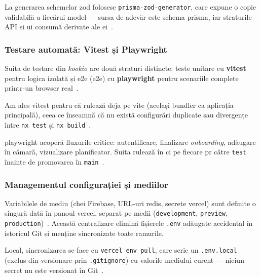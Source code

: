 La generarea schemelor \gls{zod} folosesc \texttt{prisma-zod-generator}, care expune o copie validabilă a fiecărui model --- sursa de adevăr este schema \gls{prisma}, iar straturile API și \acrshort{ui} consumă derivate ale ei~\cite{prisma_zod_generator}.

\subsubsection{Testare automată: Vitest și Playwright}\label{subsec:testare}

Suita de testare din \textit{\gls{kookio}} are două straturi distincte: teste unitare cu \textbf{\gls{vitest}} pentru logica izolată și \acrlong{e2e} (\acrshort{e2e}) cu \textbf{\gls{playwright}} pentru scenariile complete printr-un browser real~\cite{vitest,playwright}.

Am ales \gls{vitest} pentru că rulează deja pe \gls{vite} (același bundler ca aplicația principală), ceea ce înseamnă că nu există configurări duplicate sau divergențe între \texttt{nx test} și \texttt{nx build}~\cite{vitest,vite}.

\gls{playwright} acoperă fluxurile critice: autentificare, finalizare \textit{onboarding}, adăugare în cămară, vizualizare planificator.
Suita rulează în \acrshort{ci} pe fiecare \acrshort{pr} către \texttt{test} înainte de promovarea în \texttt{main}~\cite{playwright}.

\subsubsection{Managementul configurației și mediilor}\label{subsec:configuratie}

Variabilele de mediu (chei Firebase, URL-uri \gls{redis}, secrete \gls{vercel}) sunt definite o singură dată în panoul \gls{vercel}, separat pe medii (\texttt{development}, \texttt{preview}, \texttt{production})~\cite{vercel_cli}.
Această centralizare elimină fișierele \texttt{.env} adăugate accidental în istoricul Git și menține sincronizate toate ramurile.

Local, sincronizarea se face cu \texttt{vercel env pull}, care scrie un \texttt{.env.local} (exclus din versionare prin \texttt{.gitignore}) cu valorile mediului curent --- niciun secret nu este versionat în Git~\cite{vercel_cli}.
